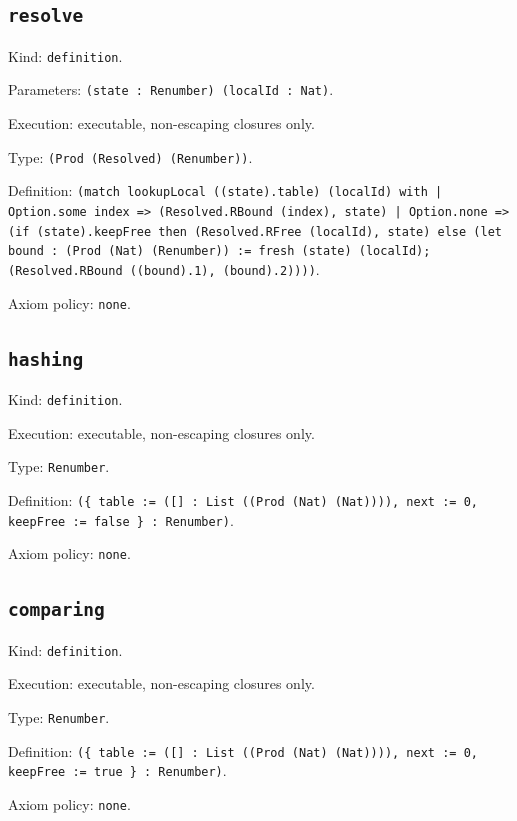 \documentclass[11pt]{article}
\begin{document}
\subsection*{\texttt{resolve}}
\noindent Kind: \texttt{definition}.\par
\noindent Parameters: \texttt{(state : Renumber) (localId : Nat)}.\par
\noindent Execution: executable, non-escaping closures only.\par
\noindent Type: \texttt{(Prod (Resolved) (Renumber))}.\par
\noindent Definition: \texttt{(match lookupLocal ((state).table) (localId) with | Option.some index => (Resolved.RBound (index), state) | Option.none => (if (state).keepFree then (Resolved.RFree (localId), state) else (let bound : (Prod (Nat) (Renumber)) := fresh (state) (localId); (Resolved.RBound ((bound).1), (bound).2))))}.\par
\noindent Axiom policy: \texttt{none}.\par
\subsection*{\texttt{hashing}}
\noindent Kind: \texttt{definition}.\par
\noindent Execution: executable, non-escaping closures only.\par
\noindent Type: \texttt{Renumber}.\par
\noindent Definition: \texttt{(\{ table := ([] : List ((Prod (Nat) (Nat)))), next := 0, keepFree := false \} : Renumber)}.\par
\noindent Axiom policy: \texttt{none}.\par
\subsection*{\texttt{comparing}}
\noindent Kind: \texttt{definition}.\par
\noindent Execution: executable, non-escaping closures only.\par
\noindent Type: \texttt{Renumber}.\par
\noindent Definition: \texttt{(\{ table := ([] : List ((Prod (Nat) (Nat)))), next := 0, keepFree := true \} : Renumber)}.\par
\noindent Axiom policy: \texttt{none}.\par
\end{document}
